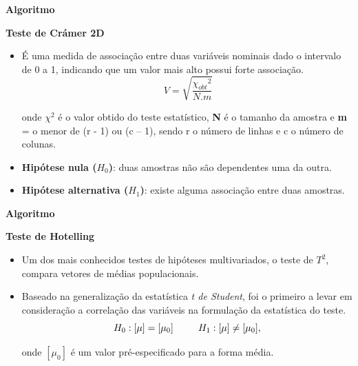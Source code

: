 \documentclass[xcolor=dvipsnames,10pt]{beamer}
\begin{document}
\begin{frame}{\textbf{Algoritmo}}
  \begin{block}{{\textbf{Teste de Crámer 2D}}}
    \begin{itemize}
      \item É uma medida de associação entre duas variáveis nominais dado o intervalo de 0 a 1, indicando que um valor mais alto possui forte associação.
      \begin{equation}
        \ V = \sqrt{\frac{{\chi_{obt}}^2}{N.m}}
        \label{eq:eq1}
        \end{equation}
  
        onde \textbf{$\chi^2$} é o valor obtido do teste estatístico,
        \textbf{N} é o tamanho da amostra e
        \textbf{m} = o menor de (r - 1) ou (c – 1), sendo r o número de linhas e c o número de colunas.
      \item \textbf{Hipótese nula ($H_0$)}: duas amostras não são dependentes uma da outra.
      \item \textbf{Hipótese alternativa ($H_1$)}: existe alguma associação entre duas amostras.
    \end{itemize}
  \end{block}
\end{frame}

\begin{frame}{\textbf{Algoritmo}}
  \begin{block}{{\textbf{Teste de Hotelling}}}
    \begin{itemize}
      \item  Um dos mais conhecidos testes de hipóteses multivariados, o teste de $T^2$, compara vetores de médias populacionais.
      \item Baseado na generalização da estatística \textit{t de Student}, foi o primeiro a levar em consideração a correlação das variáveis na formulação da estatística do teste.
      \begin{equation}
        H_0 : [\mu] = [\mu_0] \hspace{6 ex} H_1 : [\mu] \neq [\mu_0],     
        \end{equation}
  
        onde $[\mu_0]$ é um valor pré-especificado para a forma média.
    \end{itemize}
  \end{block}
\end{frame}
\end{document}
